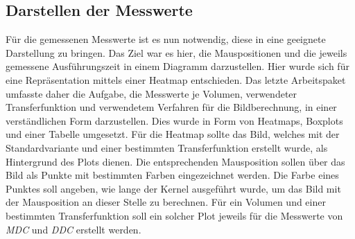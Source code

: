 \subsection{Darstellen der Messwerte}
Für die gemessenen Messwerte ist es nun notwendig, diese in eine geeignete Darstellung zu bringen.
Das Ziel war es hier, die Mauspositionen und die jeweils gemessene Ausführungszeit in einem Diagramm darzustellen.
Hier wurde sich für eine Repräsentation mittels einer Heatmap entschieden.
Das letzte Arbeitspaket umfasste daher die Aufgabe, die Messwerte je Volumen, verwendeter Transferfunktion und verwendetem Verfahren für die Bildberechnung, in einer verständlichen Form darzustellen.
Dies wurde in Form von Heatmaps, Boxplots und einer Tabelle umgesetzt.
Für die Heatmap sollte das Bild, welches mit der Standardvariante und einer bestimmten Transferfunktion erstellt wurde, als Hintergrund des Plots dienen.
Die entsprechenden Mausposition sollen über das Bild als Punkte mit bestimmten Farben eingezeichnet werden.
Die Farbe eines Punktes soll angeben, wie lange der Kernel ausgeführt wurde, um das Bild mit der Mausposition an dieser Stelle zu berechnen.
Für ein Volumen und einer bestimmten Transferfunktion soll ein solcher Plot jeweils für die Messwerte von \emph{MDC} und \emph{DDC} erstellt werden.

